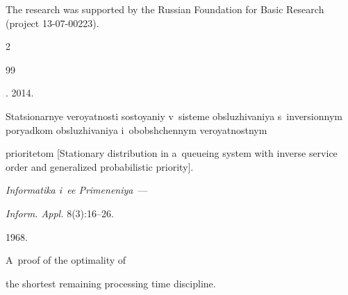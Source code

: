 \Ack


\noindent


The research was supported by the Russian Foundation for Basic Research (project 13-07-00223).
















  \begin{multicols}{2}





\renewcommand{\bibname}{\protect\rmfamily References}













{\small\frenchspacing


 {%




 \begin{thebibliography}{99}




. 2014.


Sta\-tsi\-o\-nar\-nye veroyatnosti sostoyaniy v~sisteme obsluzhivaniya s~inversionnym poryadkom obsluzhivaniya i~obobshchennym veroyat\-no\-st\-nym


prioritetom [Stationary distribution in a~queueing system with inverse service order and generalized probabilistic priority].


\textit{Informatika i~ee Primeneniya}~---


 \textit{Inform. Appl.}  8(3):16--26.







 1968.


A~proof of the optimality of


the shortest remaining processing time discipline.



\end{thebibliography}}}
\end{multicols}
